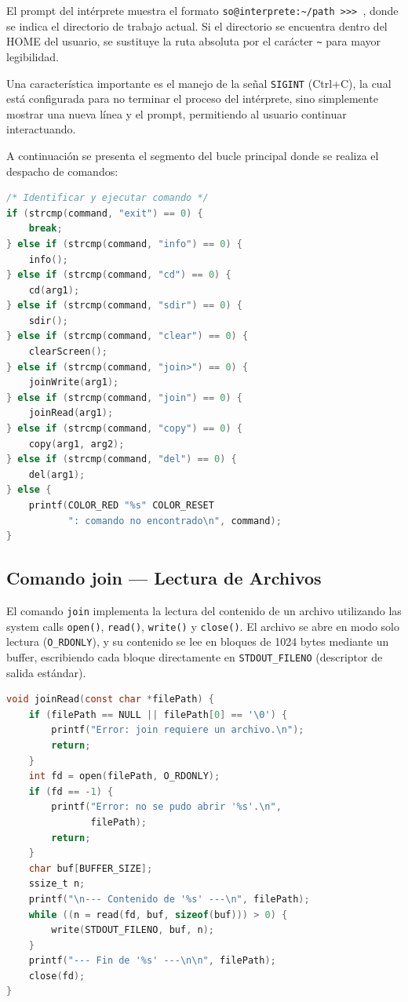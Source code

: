         El prompt del intérprete muestra el formato \texttt{so@interprete:\textasciitilde/path >>> }, donde se indica el directorio de trabajo actual. Si el directorio se encuentra dentro del HOME del usuario, se sustituye la ruta absoluta por el carácter \texttt{\textasciitilde} para mayor legibilidad.

        Una característica importante es el manejo de la señal \texttt{SIGINT} (Ctrl+C), la cual está configurada para no terminar el proceso del intérprete, sino simplemente mostrar una nueva línea y el prompt, permitiendo al usuario continuar interactuando.

        A continuación se presenta el segmento del bucle principal donde se realiza el despacho de comandos:
        \begin{lstlisting}[language=C, caption={Bucle principal - Despacho de comandos}]
/* Identificar y ejecutar comando */
if (strcmp(command, "exit") == 0) {
    break;
} else if (strcmp(command, "info") == 0) {
    info();
} else if (strcmp(command, "cd") == 0) {
    cd(arg1);
} else if (strcmp(command, "sdir") == 0) {
    sdir();
} else if (strcmp(command, "clear") == 0) {
    clearScreen();
} else if (strcmp(command, "join>") == 0) {
    joinWrite(arg1);
} else if (strcmp(command, "join") == 0) {
    joinRead(arg1);
} else if (strcmp(command, "copy") == 0) {
    copy(arg1, arg2);
} else if (strcmp(command, "del") == 0) {
    del(arg1);
} else {
    printf(COLOR_RED "%s" COLOR_RESET
           ": comando no encontrado\n", command);
}
        \end{lstlisting}

    \subsection{Comando join — Lectura de Archivos}
        El comando \texttt{join} implementa la lectura del contenido de un archivo utilizando las system calls \texttt{open()}, \texttt{read()}, \texttt{write()} y \texttt{close()}. El archivo se abre en modo solo lectura (\texttt{O\_RDONLY}), y su contenido se lee en bloques de 1024 bytes mediante un buffer, escribiendo cada bloque directamente en \texttt{STDOUT\_FILENO} (descriptor de salida estándar).

        \begin{lstlisting}[language=C, caption={Comando join - Lectura con system calls}]
void joinRead(const char *filePath) {
    if (filePath == NULL || filePath[0] == '\0') {
        printf("Error: join requiere un archivo.\n");
        return;
    }
    int fd = open(filePath, O_RDONLY);
    if (fd == -1) {
        printf("Error: no se pudo abrir '%s'.\n",
               filePath);
        return;
    }
    char buf[BUFFER_SIZE];
    ssize_t n;
    printf("\n--- Contenido de '%s' ---\n", filePath);
    while ((n = read(fd, buf, sizeof(buf))) > 0) {
        write(STDOUT_FILENO, buf, n);
    }
    printf("--- Fin de '%s' ---\n\n", filePath);
    close(fd);
}
        \end{lstlisting}

